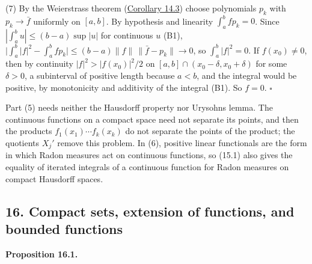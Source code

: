\documentclass[
  english,
  11pt,
  a4paper,
]{article}
\begin{document}
(7) By the Weierstrass theorem
(\hyperlink{the-stone-weierstrass-theorem-for-functions-vanishing-at-infinity--oa-fnd-sw-14}{Corollary
14.3}) choose polynomials \(p_k\) with \(p_k\to\bar f\) uniformly on
\([a,b]\). By hypothesis and linearity \(\int_a^bfp_k=0\). Since
\(|\int_a^bu|\leq(b-a)\sup|u|\) for continuous \(u\) (B1),
\(\bigl|\int_a^b|f|^2-\int_a^bfp_k\bigr|\leq(b-a)\|f\|\,\|\bar f-p_k\|\to0\),
so \(\int_a^b|f|^2=0\). If \(f(x_0)\neq0\), then by continuity
\(|f|^2>|f(x_0)|^2/2\) on \([a,b]\cap(x_0-\delta,x_0+\delta)\) for some
\(\delta>0\), a subinterval of positive length because \(a<b\), and the
integral would be positive, by monotonicity and additivity of the
integral (B1). So \(f=0\). \(\square\)

Part (5) needs neither the Hausdorff property nor
Urysohn\textquotesingle s lemma. The continuous functions on a compact
space need not separate its points, and then the products
\(f_1(x_1)\cdots f_k(x_k)\) do not separate the points of the product;
the quotients \(X_j'\) remove this problem. In (6), positive linear
functionals are the form in which Radon measures act on continuous
functions, so (15.1) also gives the equality of iterated integrals of a
continuous function for Radon measures on compact Hausdorff spaces.

\subsection[16. Compact sets, extension of functions, and bounded
functions]{\texorpdfstring{\protect\hypertarget{the-stone-weierstrass-theorem-for-functions-vanishing-at-infinity--oa-fnd-sw-18}{}{}16.
Compact sets, extension of functions, and bounded
functions}{16. Compact sets, extension of functions, and bounded functions}}\label{the-stone-weierstrass-theorem-for-functions-vanishing-at-infinity--OA-FND-SW-18}

\textbf{Proposition 16.1.}
\end{document}
